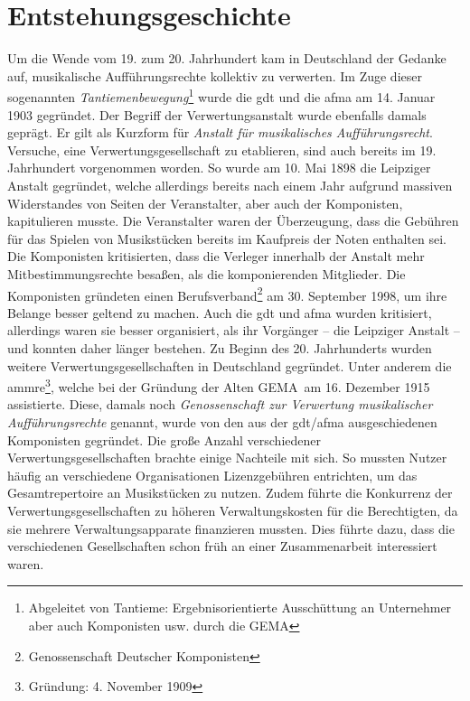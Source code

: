 \section{Entstehungsgeschichte}
\glqq Um die Wende vom 19. zum 20. Jahrhundert kam in Deutschland der Gedanke auf, musikalische Aufführungsrechte kollektiv zu verwerten.\grqq {} Im Zuge dieser sogenannten \textit{Tantiemenbewegung}\footnote{Abgeleitet von Tantieme: Ergebnisorientierte Ausschüttung an Unternehmer aber auch Komponisten usw. durch die GEMA} wurde die \gls{gdt} und die \gls{afma} am 14. Januar 1903 gegründet. Der Begriff der Verwertungsanstalt wurde ebenfalls damals geprägt. Er gilt als Kurzform für \textit{Anstalt für musikalisches Aufführungsrecht}.
\newline
\newline
Versuche, eine Verwertungsgesellschaft zu etablieren, sind auch bereits im 19. Jahrhundert vorgenommen worden. So wurde am 10. Mai 1898 die Leipziger Anstalt gegründet, welche allerdings bereits nach einem Jahr aufgrund massiven Widerstandes von Seiten der Veranstalter, aber auch der Komponisten, kapitulieren musste. Die Veranstalter waren der Überzeugung, dass die Gebühren für das Spielen von Musikstücken bereits im Kaufpreis der Noten enthalten sei. Die Komponisten kritisierten, dass die Verleger innerhalb der Anstalt mehr Mitbestimmungsrechte besaßen, als die komponierenden Mitglieder. Die Komponisten gründeten einen Berufsverband\footnote{Genossenschaft Deutscher Komponisten} am 30. September 1998, um ihre Belange besser geltend zu machen.
\newline
\newline
Auch die \gls{gdt} und \gls{afma} wurden kritisiert, allerdings waren sie besser organisiert, als ihr Vorgänger -- die Leipziger Anstalt -- und konnten daher länger bestehen. Zu Beginn des 20. Jahrhunderts wurden weitere Verwertungsgesellschaften in Deutschland gegründet. Unter anderem die \gls{ammre}\footnote{Gründung: 4. November 1909}, welche bei der Gründung der \glqq Alten GEMA\grqq~am 16. Dezember 1915 assistierte. Diese, damals noch \textit{Genossenschaft zur Verwertung musikalischer Aufführungsrechte} genannt, wurde von den aus der \gls{gdt}/\gls{afma} ausgeschiedenen Komponisten gegründet.
\newline
\newline
Die große Anzahl verschiedener Verwertungsgesellschaften brachte einige Nachteile mit sich. So mussten Nutzer häufig an verschiedene Organisationen Lizenzgebühren entrichten, um das Gesamtrepertoire an Musikstücken zu nutzen. Zudem führte die Konkurrenz der Verwertungsgesellschaften zu höheren Verwaltungskosten für die Berechtigten, da sie mehrere Verwaltungsapparate finanzieren mussten. Dies führte dazu, dass die verschiedenen Gesellschaften schon früh an einer Zusammenarbeit interessiert waren.
